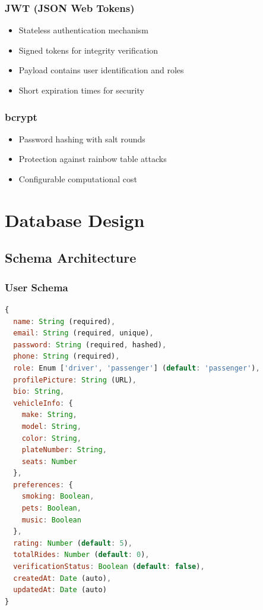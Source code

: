 \documentclass[12pt,a4paper]{article}
\begin{document}
\subsubsection{JWT (JSON Web Tokens)}
\begin{itemize}
    \item Stateless authentication mechanism
    \item Signed tokens for integrity verification
    \item Payload contains user identification and roles
    \item Short expiration times for security
\end{itemize}

\subsubsection{bcrypt}
\begin{itemize}
    \item Password hashing with salt rounds
    \item Protection against rainbow table attacks
    \item Configurable computational cost
\end{itemize}

\newpage

\section{Database Design}

\subsection{Schema Architecture}

\subsubsection{User Schema}
\begin{lstlisting}[language=JavaScript, caption=User Model Structure]
{
  name: String (required),
  email: String (required, unique),
  password: String (required, hashed),
  phone: String (required),
  role: Enum ['driver', 'passenger'] (default: 'passenger'),
  profilePicture: String (URL),
  bio: String,
  vehicleInfo: {
    make: String,
    model: String,
    color: String,
    plateNumber: String,
    seats: Number
  },
  preferences: {
    smoking: Boolean,
    pets: Boolean,
    music: Boolean
  },
  rating: Number (default: 5),
  totalRides: Number (default: 0),
  verificationStatus: Boolean (default: false),
  createdAt: Date (auto),
  updatedAt: Date (auto)
}
\end{lstlisting}
\end{document}
